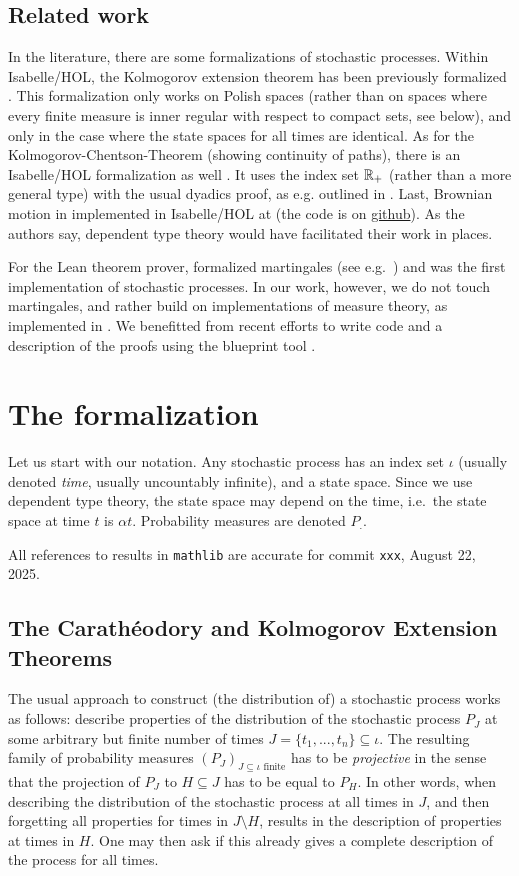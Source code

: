 \documentclass[lean]{DraftAFM}
\begin{document}
\subsection{Related work}
In the literature, there are some formalizations of stochastic processes. Within Isabelle/HOL, the Kolmogorov extension theorem has been previously formalized \cite{Immler2012}. This formalization only works on Polish spaces (rather than on spaces where every finite measure is inner regular with respect to compact sets, see below), and only in the case where the state spaces for all times are identical. As for the Kolmogorov-Chentson-Theorem (showing continuity of paths), there is an Isabelle/HOL formalization as well \cite{Kolmogorov_Chentsov-AFP}. It uses the index set  $\mathbb{R}_+$ (rather than a more general type) with the usual dyadics proof, as e.g. outlined in \cite{kallenberg2021}. Last,
Brownian motion in implemented in Isabelle/HOL at \cite{laursen2024brownian} (the code is on \href{https://github.com/cplaursen/Brownian_Motion}{github}). As the authors say, dependent type theory would have facilitated their work in places.

For the Lean theorem prover, \cite{ying2023formalization} formalized martingales (see e.g.\ \cite{kallenberg2021}) and was the first implementation of stochastic processes. In our work, however, we do not touch martingales, and rather build on implementations of measure theory, as implemented in \cite{mathlib}. We benefitted from recent efforts to write code and a description of the proofs using the blueprint tool \cite{Monticone_LeanProject_2025}.

\section{The formalization}
Let us start with our notation. Any stochastic process has an index set $\iota$ (usually denoted {\em time}, usually uncountably infinite), and a state space. Since we use dependent type theory, the state space may depend on the time, i.e.\ the state space at time $t$ is $\alpha t$. Probability measures are denoted $P_.$.

All references to results in \lstinline|mathlib| are accurate for commit {\tt xxx}, August 22, 2025.

\subsection{The Carathéodory and Kolmogorov Extension Theorems}
The usual approach to construct (the distribution of) a stochastic process works as follows: describe properties of the distribution of the stochastic process $P_J$ at some arbitrary but finite number of times $J = \{t_1,...,t_n\} \subseteq \iota$.
The resulting family of probability measures $(P_J)_{J \subseteq \iota \text{ finite}}$ has to be {\em projective} in the sense that the projection of $P_J$ to $H\subseteq J$ has to be equal to $P_H$. In other words, when describing the distribution of the stochastic process at all times in $J$, and then forgetting all properties for times in $J\setminus H$, results in the description of properties at times in $H$. One may then ask if this already gives a complete description of the process for all times.
\end{document}
